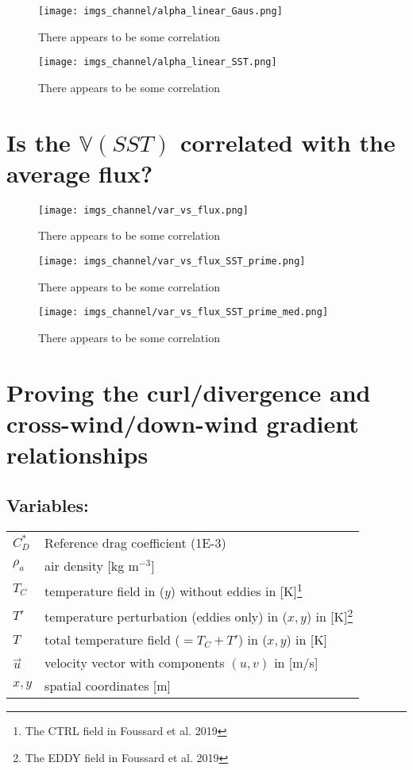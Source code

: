 \documentclass[12pt,a4paper]{article}
\begin{document}
\begin{figure}[h!]
\centering
\texttt{[image: imgs\_channel/alpha\_linear\_Gaus.png]}
\caption{There appears to be some correlation}
\end{figure}

\begin{figure}[h!]
\centering
\texttt{[image: imgs\_channel/alpha\_linear\_SST.png]}
\caption{There appears to be some correlation}
\end{figure}


\section{Is the $\mathbb{V}(SST)$ correlated with the average flux?}

\begin{figure}[h!]
\centering
\texttt{[image: imgs\_channel/var\_vs\_flux.png]}
\caption{There appears to be some correlation}
\end{figure}

\begin{figure}[h!]
\centering
\texttt{[image: imgs\_channel/var\_vs\_flux\_SST\_prime.png]}
\caption{There appears to be some correlation}
\end{figure}

\begin{figure}[h!]
\centering
\texttt{[image: imgs\_channel/var\_vs\_flux\_SST\_prime\_med.png]}
\caption{There appears to be some correlation}
\end{figure}

\appendix
\section{Proving the curl/divergence and cross-wind/down-wind gradient relationships}
\subsection*{Variables:}
\begin{table}[h!]
\begin{tabular}{ll}
 $C_D^*$ &  Reference drag coefficient (1E-3) \\
 $\rho_a$ &  air density [kg m$^{-3}$] \\
 $T_C$ & temperature field in ($y$) without eddies in [K]\footnote{The CTRL field in Foussard et al. 2019}  \\
 $T'$ & temperature perturbation (eddies only) in ($x,y$) in [K]\footnote{The EDDY field in Foussard et al. 2019}  \\
  $T$ & total temperature field ($=T_C + T'$) in ($x,y$) in [K]  \\
 $\vec{u}$ & velocity vector with components $(u,v)$ in [m/s] \\
 $x,y$ & spatial coordinates [m]
\end{tabular}
\end{table}
\end{document}
